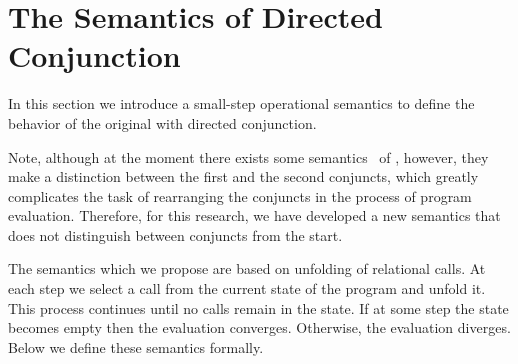 \section{The Semantics of Directed Conjunction}
\label{sec:directed-semantics}

In this section we introduce a small-step operational semantics to define the behavior of the original \mk with directed conjunction. 


Note, although at the moment there exists some semantics~\cite{fair:conversion,fair:semantics} of \mk, however, they make a distinction between the first
and the second conjuncts, which greatly complicates the task of rearranging the conjuncts in the process of program evaluation. 
Therefore, for this research, we have developed a new semantics that does not distinguish between conjuncts from the start.


The semantics which we propose are based on unfolding of relational calls. At each step we select a call from the current state of the program and unfold it.
This process continues until no calls remain in the state. If at some step the state becomes empty then the evaluation converges. Otherwise, the evaluation diverges. Below we define these semantics formally.

